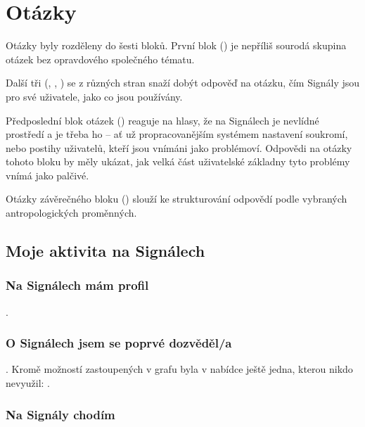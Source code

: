 \section{Otázky}

Otázky byly rozděleny do šesti bloků.
První blok ()
je nepříliš sourodá skupina otázek bez opravdového společného tématu.

Další tři
(, , )
se z různých stran snaží dobýt odpověď na otázku, čím Signály jsou
pro své uživatele, jako co jsou používány.

Předposlední blok otázek ()
reaguje na hlasy, že na Signálech je nevlídné prostředí
a je třeba ho  -- ať už propracovanějším systémem nastavení
soukromí, nebo postihy uživatelů, kteří jsou vnímáni jako problémoví.
Odpovědi na otázky tohoto bloku by měly ukázat, jak velká část
uživatelské základny tyto problémy vnímá jako palčivé.

Otázky závěrečného bloku ()
slouží ke strukturování odpovědí
podle vybraných antropologických proměnných.

\vfill

\subsection{Moje aktivita na Signálech}\label{sec:mojeaktivita}

\subsubsection{Na Signálech mám profil}\label{sec:mamprofil}

\qtype \pickOne.


\subsubsection{O Signálech jsem se poprvé dozvěděl/a}

\qtype \pickOne.
Kromě možností zastoupených v grafu byla v nabídce ještě jedna,
kterou nikdo nevyužil: .


\subsubsection{Na Signály chodím}

